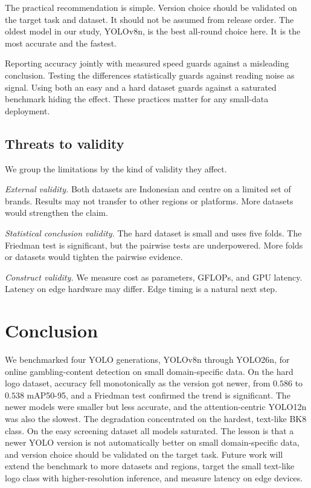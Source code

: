 \documentclass[conference]{IEEEtran}
\begin{document}
The practical recommendation is simple. Version choice should be validated on
the target task and dataset. It should not be assumed from release order. The
oldest model in our study, YOLOv8n, is the best all-round choice here. It is the
most accurate and the fastest.

Reporting accuracy jointly with measured speed guards against a misleading
conclusion. Testing the differences statistically guards against reading noise
as signal. Using both an easy and a hard dataset guards against a saturated
benchmark hiding the effect. These practices matter for any small-data
deployment.

\subsection{Threats to validity}
We group the limitations by the kind of validity they affect.

\textit{External validity.} Both datasets are Indonesian and centre on a limited
set of brands. Results may not transfer to other regions or platforms. More
datasets would strengthen the claim.

\textit{Statistical conclusion validity.} The hard dataset is small and uses
five folds. The Friedman test is significant, but the pairwise tests are
underpowered. More folds or datasets would tighten the pairwise evidence.

\textit{Construct validity.} We measure cost as parameters, GFLOPs, and GPU
latency. Latency on edge hardware may differ. Edge timing is a natural next
step.

\FloatBarrier
\section{Conclusion}
We benchmarked four YOLO generations, YOLOv8n through YOLO26n, for online
gambling-content detection on small domain-specific data. On the hard logo
dataset, accuracy fell monotonically as the version got newer, from $0.586$ to
$0.538$ mAP50-95, and a Friedman test confirmed the trend is significant. The
newer models were smaller but less accurate, and the attention-centric YOLO12n
was also the slowest. The degradation concentrated on the hardest, text-like
BK8 class. On the easy screening dataset all models saturated. The lesson is
that a newer YOLO version is not automatically better on small domain-specific
data, and version choice should be validated on the target task. Future work
will extend the benchmark to more datasets and regions, target the small
text-like logo class with higher-resolution inference, and measure latency on
edge devices.



\end{document}
